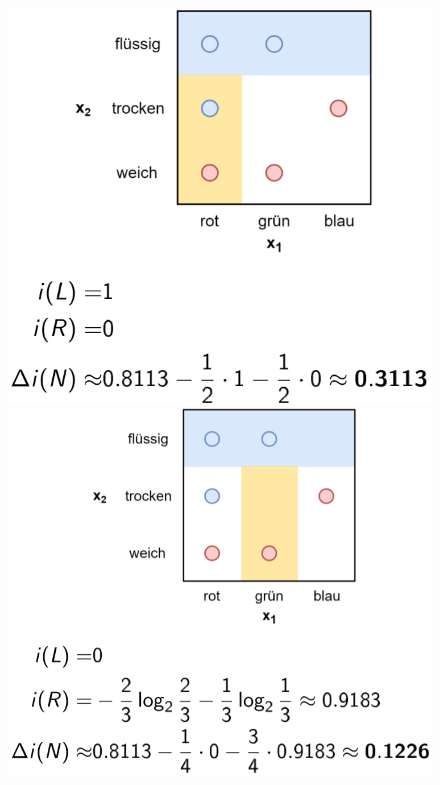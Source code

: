 \documentclass{report}
\begin{document}
  \begin{figure}[H]	
    \centering	
    \begin{minipage}[b]{0.4\textwidth}	
      \includegraphics[scale=.235]{ml07_15}	
    \end{minipage}	
    \begin{minipage}[b]{0.4\textwidth}	
      \includegraphics[scale=.235]{ml07_16}	
    \end{minipage}	
  \end{figure}	
  
\end{document}
